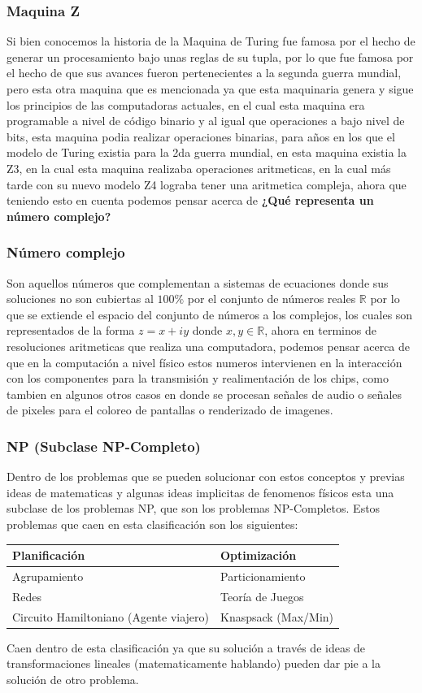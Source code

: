 \documentclass[10pt,executivepaper]{article}
\begin{document}
\subsubsection{Maquina Z}
Si bien conocemos la historia de la Maquina de Turing fue famosa por el hecho de generar un procesamiento bajo unas reglas de su tupla, por lo que fue famosa por el hecho de que sus avances fueron pertenecientes a la segunda guerra mundial, pero esta otra maquina que es mencionada ya que esta maquinaria genera y sigue los principios de las computadoras actuales, en el cual esta maquina era programable a nivel de código binario y al igual que operaciones a bajo nivel de bits, esta maquina podia realizar operaciones binarias, para años en los que el modelo de Turing existia para la 2{\tiny da} guerra mundial, en esta maquina existia la Z{\tiny 3}, en la cual esta maquina realizaba operaciones aritmeticas, en la cual más tarde con su nuevo modelo Z{\tiny 4} lograba tener una aritmetica compleja, ahora que teniendo esto en cuenta podemos pensar acerca de \textbf{¿Qué representa un número complejo?}
\subsubsection{Número complejo}
Son aquellos números que complementan a sistemas de ecuaciones donde sus soluciones no son cubiertas al $100\%$ por el conjunto de números reales $\mathbb{R}$ por lo que se extiende el espacio del conjunto de números a los complejos, los cuales son representados de la forma $z=x+iy$ donde $x,y \in\mathbb{R}$, ahora en terminos de resoluciones aritmeticas que realiza una computadora, podemos pensar acerca de que en la computación a nivel físico estos numeros intervienen en la interacción con los componentes para la transmisión y realimentación de los chips, como tambien en algunos otros casos en donde se procesan señales de audio o señales de pixeles para el coloreo de pantallas o renderizado de imagenes.
\subsubsection{NP (Subclase NP-Completo)}

Dentro de los problemas que se pueden solucionar con estos conceptos y previas ideas de matematicas y algunas ideas implicitas de fenomenos físicos esta una subclase de los problemas NP, que son los problemas NP-Completos. Estos problemas que caen en esta clasificación son los siguientes:
\begin{center}
  \begin{tabular}{|p{5.5cm}|p{5.5cm}|}
    \hline
    Planificación & Optimización\\
    \hline
    Agrupamiento & Particionamiento\\
    \hline
    Redes & Teoría de Juegos\\
    \hline
    Circuito Hamiltoniano (Agente viajero) & Knaspsack (Max/Min)\\
    \hline
  \end{tabular}
\end{center}
Caen dentro de esta clasificación ya que su solución a través de ideas de transformaciones lineales (matematicamente hablando) pueden dar pie a la solución de otro problema.
\printindex
\end{document}
